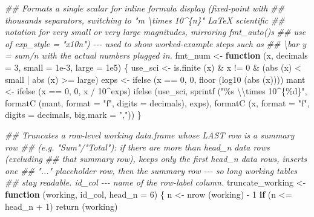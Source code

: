 \documentclass[
  letterpaper,
  DIV=11,
  numbers=noendperiod]{scrreprt}
\newenvironment{Shaded}{\begin{snugshade}}{\end{snugshade}}
\newcommand{\AttributeTok}[1]{\textcolor[rgb]{0.40,0.45,0.13}{#1}}
\newcommand{\ControlFlowTok}[1]{\textcolor[rgb]{0.00,0.23,0.31}{\textbf{#1}}}
\newcommand{\DecValTok}[1]{\textcolor[rgb]{0.68,0.00,0.00}{#1}}
\newcommand{\DocumentationTok}[1]{\textcolor[rgb]{0.37,0.37,0.37}{\textit{#1}}}
\newcommand{\FloatTok}[1]{\textcolor[rgb]{0.68,0.00,0.00}{#1}}
\newcommand{\FunctionTok}[1]{\textcolor[rgb]{0.28,0.35,0.67}{#1}}
\newcommand{\NormalTok}[1]{\textcolor[rgb]{0.00,0.23,0.31}{#1}}
\newcommand{\OtherTok}[1]{\textcolor[rgb]{0.00,0.23,0.31}{#1}}
\newcommand{\SpecialCharTok}[1]{\textcolor[rgb]{0.37,0.37,0.37}{#1}}
\newcommand{\StringTok}[1]{\textcolor[rgb]{0.13,0.47,0.30}{#1}}
\renewcommand{\[}{\begin{equation}}
\renewcommand{\]}{\end{equation}}
\begin{document}
\begin{Shaded}
\begin{Highlighting}[]
\DocumentationTok{\#\# Formats a single scalar for inline formula display (fixed{-}point with}
\DocumentationTok{\#\# thousands separators, switching to "m \textbackslash{}times 10\^{}\{n\}" LaTeX scientific}
\DocumentationTok{\#\# notation for very small or very large magnitudes, mirroring fmt\_auto()\textquotesingle{}s}
\DocumentationTok{\#\# use of exp\_style = "x10n") {-}{-}{-} used to show worked{-}example steps such as}
\DocumentationTok{\#\# \textbackslash{}bar y = sum/n with the actual numbers plugged in.}
\NormalTok{fmt\_num }\OtherTok{\textless{}{-}} \ControlFlowTok{function}\NormalTok{ (x, }\AttributeTok{decimals =} \DecValTok{3}\NormalTok{, }\AttributeTok{small =} \FloatTok{1e{-}3}\NormalTok{, }\AttributeTok{large =} \FloatTok{1e5}\NormalTok{)}
\NormalTok{\{}
\NormalTok{    use\_sci }\OtherTok{\textless{}{-}} \FunctionTok{is.finite}\NormalTok{ (x) }\SpecialCharTok{\&}\NormalTok{ x }\SpecialCharTok{!=} \DecValTok{0} \SpecialCharTok{\&}\NormalTok{ (}\FunctionTok{abs}\NormalTok{ (x) }\SpecialCharTok{\textless{}}\NormalTok{ small }\SpecialCharTok{|} \FunctionTok{abs}\NormalTok{ (x) }\SpecialCharTok{\textgreater{}=}\NormalTok{ large)}
\NormalTok{    exps    }\OtherTok{\textless{}{-}} \FunctionTok{ifelse}\NormalTok{ (x }\SpecialCharTok{==} \DecValTok{0}\NormalTok{, }\DecValTok{0}\NormalTok{, }\FunctionTok{floor}\NormalTok{ (}\FunctionTok{log10}\NormalTok{ (}\FunctionTok{abs}\NormalTok{ (x))))}
\NormalTok{    mant    }\OtherTok{\textless{}{-}} \FunctionTok{ifelse}\NormalTok{ (x }\SpecialCharTok{==} \DecValTok{0}\NormalTok{, }\DecValTok{0}\NormalTok{, x }\SpecialCharTok{/} \DecValTok{10}\SpecialCharTok{\^{}}\NormalTok{exps)}
    \FunctionTok{ifelse}\NormalTok{ (use\_sci,}
            \FunctionTok{sprintf}\NormalTok{ (}\StringTok{"\%s }\SpecialCharTok{\textbackslash{}\textbackslash{}}\StringTok{times 10\^{}\{\%d\}"}\NormalTok{, }\FunctionTok{formatC}\NormalTok{ (mant, }\AttributeTok{format =} \StringTok{"f"}\NormalTok{, }\AttributeTok{digits =}\NormalTok{ decimals), exps),}
            \FunctionTok{formatC}\NormalTok{ (x, }\AttributeTok{format =} \StringTok{"f"}\NormalTok{, }\AttributeTok{digits =}\NormalTok{ decimals, }\AttributeTok{big.mark =} \StringTok{","}\NormalTok{))}
\NormalTok{\}}

\DocumentationTok{\#\# Truncates a row{-}level working data.frame whose LAST row is a summary row}
\DocumentationTok{\#\# (e.g. "Sum"/"Total"): if there are more than head\_n data rows (excluding}
\DocumentationTok{\#\# that summary row), keeps only the first head\_n data rows, inserts one}
\DocumentationTok{\#\# "..." placeholder row, then the summary row {-}{-}{-} so long working tables}
\DocumentationTok{\#\# stay readable. id\_col {-}{-}{-} name of the row{-}label column.}
\NormalTok{truncate\_working }\OtherTok{\textless{}{-}} \ControlFlowTok{function}\NormalTok{ (working, id\_col, }\AttributeTok{head\_n =} \DecValTok{6}\NormalTok{)}
\NormalTok{\{}
\NormalTok{    n }\OtherTok{\textless{}{-}} \FunctionTok{nrow}\NormalTok{ (working) }\SpecialCharTok{{-}} \DecValTok{1}
    \ControlFlowTok{if}\NormalTok{ (n }\SpecialCharTok{\textless{}=}\NormalTok{ head\_n }\SpecialCharTok{+} \DecValTok{1}\NormalTok{) }\FunctionTok{return}\NormalTok{ (working)}


\end{Highlighting}
\end{Shaded}
\end{document}
